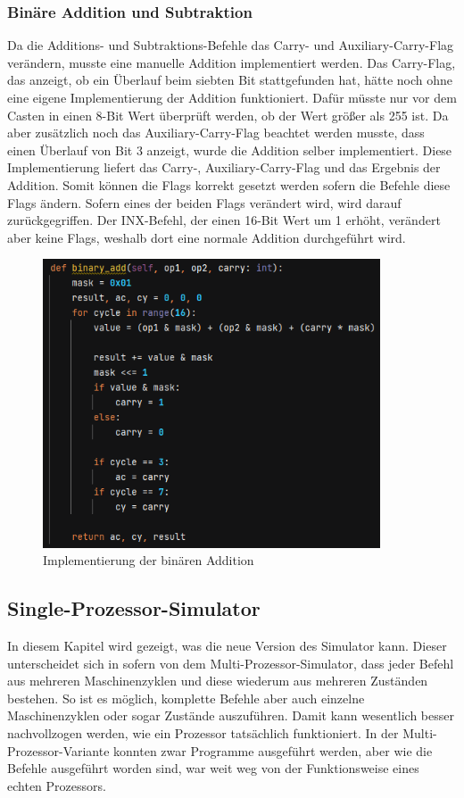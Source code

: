 \documentclass[12pt]{article}
\newcommand{\imgSpaceBefore}{\vspace{10pt}}
\begin{document}
\subsubsection{Binäre Addition und Subtraktion}
Da die Additions- und Subtraktions-Befehle das Carry- und Auxiliary-Carry-Flag verändern, musste eine manuelle Addition implementiert werden. Das Carry-Flag, das anzeigt, ob ein Überlauf beim siebten Bit stattgefunden hat, hätte noch ohne eine eigene Implementierung der Addition funktioniert. Dafür müsste nur vor dem Casten in einen 8-Bit Wert überprüft werden, ob der Wert größer als 255 ist. Da aber zusätzlich noch das Auxiliary-Carry-Flag beachtet werden musste, dass einen Überlauf von Bit 3 anzeigt, wurde die Addition selber implementiert. Diese Implementierung liefert das Carry-, Auxiliary-Carry-Flag und das Ergebnis der Addition. Somit können die Flags korrekt gesetzt werden sofern die Befehle diese Flags ändern. Sofern eines der beiden Flags verändert wird, wird darauf zurückgegriffen. Der INX-Befehl, der einen 16-Bit Wert um 1 erhöht, verändert aber keine Flags, weshalb dort eine normale Addition durchgeführt wird.

\imgSpaceBefore
\begin{figure}[H]
\centering
\includegraphics[width=10cm]{Bilder/binaere_addition}
\caption{Implementierung der binären Addition}
\label{fig:binaere_addition}
\end{figure}

\subsection{Single-Prozessor-Simulator}
\label{SPS_impl}

\noindent
In diesem Kapitel wird gezeigt, was die neue Version des Simulator kann. Dieser unterscheidet sich in sofern von dem Multi-Prozessor-Simulator, dass jeder Befehl aus mehreren Maschinenzyklen und diese wiederum aus mehreren Zuständen bestehen. So ist es möglich, komplette Befehle aber auch einzelne Maschinenzyklen oder sogar Zustände auszuführen. Damit kann wesentlich besser nachvollzogen werden, wie ein Prozessor tatsächlich funktioniert. In der Multi-Prozessor-Variante konnten zwar Programme ausgeführt werden, aber wie die Befehle ausgeführt worden sind, war weit weg von der Funktionsweise eines echten Prozessors. 
\end{document}
